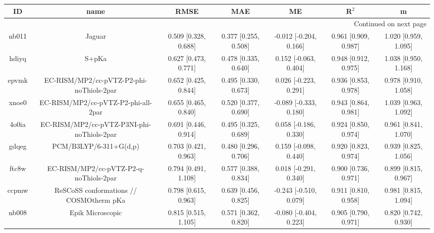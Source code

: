 \documentclass{article}
\begin{document}
\begin{center}
\begin{longtable}{|ccccccc|}
\toprule
    ID &                                               name &                  RMSE &                   MAE &                       ME &                 R$^2$ &                      m \\
\midrule
\endhead
\midrule
\multicolumn{7}{r}{{Continued on next page}} \\
\midrule
\endfoot

\bottomrule
\endlastfoot
 nb011 &                                             Jaguar &  0.509 [0.328, 0.688] &  0.377 [0.255, 0.508] &   -0.012 [-0.204, 0.166] &  0.961 [0.909, 0.987] &   1.020 [0.959, 1.095] \\
 hdiyq &                                              S+pKa &  0.627 [0.473, 0.771] &  0.478 [0.335, 0.640] &    0.152 [-0.063, 0.404] &  0.948 [0.912, 0.975] &   1.038 [0.950, 1.168] \\
 epvmk &           EC-RISM/MP2/cc-pVTZ-P2-phi-noThiols-2par &  0.652 [0.425, 0.844] &  0.495 [0.330, 0.673] &    0.026 [-0.223, 0.291] &  0.936 [0.853, 0.978] &   0.978 [0.910, 1.058] \\
 xnoe0 &                EC-RISM/MP2/cc-pVTZ-P2-phi-all-2par &  0.655 [0.465, 0.840] &  0.520 [0.377, 0.690] &   -0.089 [-0.333, 0.180] &  0.943 [0.864, 0.981] &   1.039 [0.963, 1.092] \\
 4o0ia &         EC-RISM/MP2/cc-pVTZ-P3NI-phi-noThiols-2par &  0.691 [0.446, 0.914] &  0.495 [0.325, 0.689] &    0.058 [-0.186, 0.330] &  0.924 [0.850, 0.974] &   0.961 [0.841, 1.070] \\
 gdqeg &                             PCM/B3LYP/6-311+G(d,p) &  0.703 [0.421, 0.963] &  0.480 [0.296, 0.706] &    0.159 [-0.098, 0.440] &  0.920 [0.823, 0.974] &   0.939 [0.825, 1.056] \\
 ftc8w &             EC-RISM/MP2/cc-pVTZ-P2-q-noThiols-2par &  0.794 [0.491, 1.108] &  0.577 [0.388, 0.834] &    0.018 [-0.291, 0.340] &  0.900 [0.736, 0.971] &   0.899 [0.815, 0.967] \\
 ccpmw &            ReSCoSS conformations // COSMOtherm pKa &  0.798 [0.615, 0.963] &  0.639 [0.456, 0.825] &   -0.243 [-0.510, 0.079] &  0.911 [0.810, 0.958] &   0.981 [0.815, 1.094] \\
 nb008 &                                   Epik Microscopic &  0.815 [0.515, 1.105] &  0.571 [0.362, 0.820] &   -0.080 [-0.404, 0.223] &  0.905 [0.790, 0.971] &   0.820 [0.742, 0.930] \\

\end{longtable}
\end{center}
\end{document}
